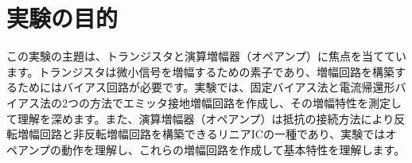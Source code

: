 \documentclass[a4paper,11pt,xelatex,ja=standard]{bxjsarticle}
\begin{document}
\section{実験の目的}
    この実験の主題は、トランジスタと演算増幅器（オペアンプ）に焦点を当てています。トランジスタは微小信号を増幅するための素子であり、増幅回路を構築するためにはバイアス回路が必要です。実験では、固定バイアス法と電流帰還形バイアス法の2つの方法でエミッタ接地増幅回路を作成し、その増幅特性を測定して理解を深めます。また、演算増幅器（オペアンプ）は抵抗の接続方法により反転増幅回路と非反転増幅回路を構築できるリニアICの一種であり、実験ではオペアンプの動作を理解し、これらの増幅回路を作成して基本特性を理解します。
\end{document}
